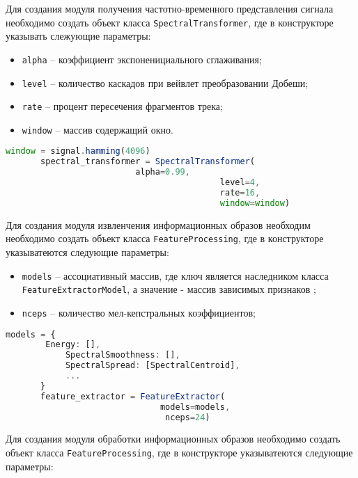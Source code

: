 Для создания модуля получения частотно-временного представления сигнала необходимо создать объект класса \texttt{SpectralTransformer}, где в конструкторе указывать слежующие параметры:

\begin{itemize} 
\item \texttt{alpha} -- коэффициент экспоненициального сглаживания;
\item \texttt{level}  -- количество каскадов при вейвлет преобразовании Добеши;
\item \texttt{rate}  -- процент пересечения фрагментов трека;
\item \texttt{window} -- массив содержащий окно.
\end{itemize}

\begin{lstlisting}[language=TypeScript, label=lst:testing:results]
       window = signal.hamming(4096)
       spectral_transformer = SpectralTransformer(
       					  alpha=0.99,
                                           level=4,
                                           rate=16,
                                           window=window)
\end{lstlisting}

Для создания модуля извленчения информационных образов необходим необходимо создать объект класса  \texttt{FeatureProcessing}, где в конструкторе указыватеются следующие параметры:

\begin{itemize} 
\item \texttt{models} -- ассоциативный массив, где ключ является наследником класса \texttt{FeatureExtractorModel}, а значение - массив зависимых признаков ;
\item \texttt{nceps}  -- количество мел-кепстральных коэффициентов;
\end{itemize}

\begin{lstlisting}[language=TypeScript, label=lst:testing:results]
       models = {
		Energy: [],
    		SpectralSmoothness: [],
     		SpectralSpread: [SpectralCentroid],
       		...
       }
       feature_extractor = FeatureExtractor(
       						   models=models,
       						    nceps=24)
\end{lstlisting}

Для создания модуля обработки информационных образов необходимо создать объект класса  \texttt{FeatureProcessing}, где в конструкторе указыватеются следующие параметры:

